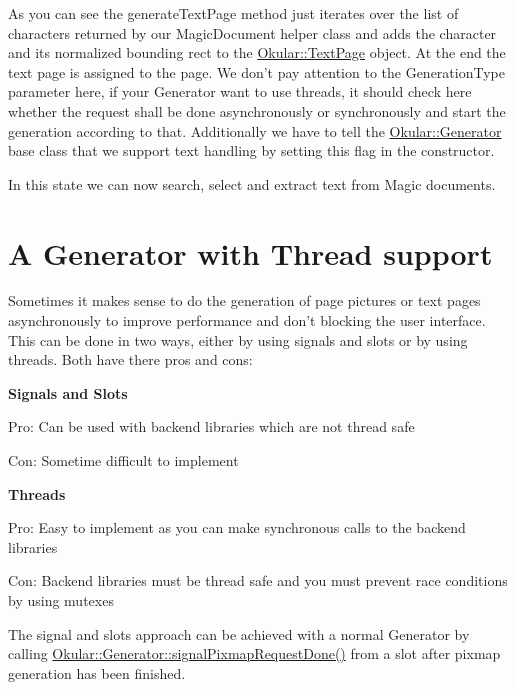 As you can see the generate\+Text\+Page method just iterates over the list of characters returned by our Magic\+Document helper class and adds the character and its normalized bounding rect to the \hyperlink{classOkular_1_1TextPage}{Okular\+::\+Text\+Page} object. At the end the text page is assigned to the page. We don't pay attention to the Generation\+Type parameter here, if your Generator want to use threads, it should check here whether the request shall be done asynchronously or synchronously and start the generation according to that. Additionally we have to tell the \hyperlink{classOkular_1_1Generator}{Okular\+::\+Generator} base class that we support text handling by setting this flag in the constructor.

In this state we can now search, select and extract text from Magic documents.\hypertarget{okular_generators_okular_generators_threaded}{}\section{A Generator with Thread support}\label{okular_generators_okular_generators_threaded}
Sometimes it makes sense to do the generation of page pictures or text pages asynchronously to improve performance and don't blocking the user interface. This can be done in two ways, either by using signals and slots or by using threads. Both have there pros and cons\+:


\begin{DoxyItemize}
\item {\bfseries Signals and Slots} 
\begin{DoxyItemize}
\item Pro\+: Can be used with backend libraries which are not thread safe 
\item Con\+: Sometime difficult to implement 
\end{DoxyItemize}
\item {\bfseries Threads} 
\begin{DoxyItemize}
\item Pro\+: Easy to implement as you can make synchronous calls to the backend libraries 
\item Con\+: Backend libraries must be thread safe and you must prevent race conditions by using mutexes 
\end{DoxyItemize}
\end{DoxyItemize}

The signal and slots approach can be achieved with a normal Generator by calling \hyperlink{classOkular_1_1Generator_abed0ea73d02be9c4a0afcd920882faf5}{Okular\+::\+Generator\+::signal\+Pixmap\+Request\+Done()} from a slot after pixmap generation has been finished.

